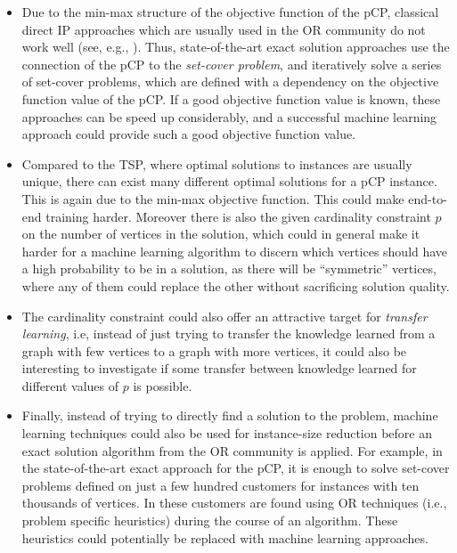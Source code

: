 \documentclass[]{article}
\newcommand{\PCP}{pCP\xspace}
\begin{document}
\begin{itemize}
	\item Due to the min-max structure of the objective function of the \PCP, 
	classical direct IP approaches which are usually used in the OR community 
	do not work well (see, e.g., \cite{snyder2011fundamentals}). Thus, 
	state-of-the-art exact solution approaches use the connection of the \PCP 
	to the \emph{set-cover problem}, and iteratively solve a series of 
	set-cover 
	problems, which are defined with a dependency on the objective function 
	value of the 
	\PCP. If a good objective 
	function value is known, these approaches can be speed up considerably, 
	and a successful machine learning approach could provide such a good 
	objective function value.
	\item Compared to the TSP, where optimal solutions to instances are usually 
	unique, there can exist many different optimal solutions for a \PCP 
	instance. This is again due to the min-max objective function. This could 
	make end-to-end training harder. Moreover there is also the given 
	cardinality constraint $p$ on the number of vertices in the solution, which 
	could in general make it harder for a machine learning algorithm to discern 
	which vertices should have a high probability to be in a solution, as there 
	will be ``symmetric'' vertices, where any of them could replace the other 
	without sacrificing solution quality.
	\item The cardinality constraint could also offer an attractive target for 
	\emph{transfer learning}, i.e, instead of just trying to transfer the 
	knowledge learned from a graph with few vertices to a graph with more 
	vertices, it could also be interesting to investigate if some transfer 
	between knowledge learned for different values of $p$ is possible.
	\item Finally, instead of trying to directly find a solution to the 
	problem, machine learning techniques could also be used for instance-size 
	reduction before an exact solution algorithm from the OR community is 
	applied. For example, in the state-of-the-art exact approach 
	\cite{contardo2019scalable} for the \PCP, it is enough to solve set-cover 
	problems defined on just a few hundred customers for instances with ten 
	thousands of vertices. In \cite{contardo2019scalable} these customers are 
	found using OR techniques (i.e., problem specific heuristics) during the 
	course of an algorithm. These heuristics could potentially be replaced 
	with machine learning approaches.
	
\end{itemize}
\end{document}
